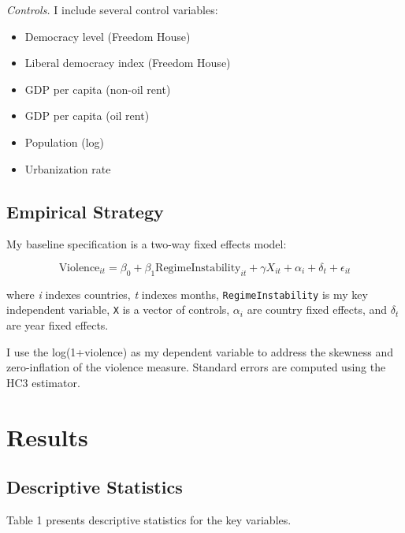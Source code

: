 \documentclass[12pt]{article}
\begin{document}
\textit{Controls.} I include several control variables:
\begin{itemize}
    \item Democracy level (Freedom House)
    \item Liberal democracy index (Freedom House)
    \item GDP per capita (non-oil rent)
    \item GDP per capita (oil rent)
    \item Population (log)
    \item Urbanization rate
\end{itemize}

\subsection{Empirical Strategy}

My baseline specification is a two-way fixed effects model:

\begin{equation}
\text{Violence}_{it} = \beta_0 + \beta_1 \text{RegimeInstability}_{it} + \gamma X_{it} + \alpha_i + \delta_t + \epsilon_{it}
\end{equation}

where \textit{i} indexes countries, \textit{t} indexes months, \texttt{RegimeInstability} is my key independent variable, \texttt{X} is a vector of controls, \texttt{$\alpha_i$} are country fixed effects, and \texttt{$\delta_t$} are year fixed effects.

I use the log(1+violence) as my dependent variable to address the skewness and zero-inflation of the violence measure. Standard errors are computed using the HC3 estimator.

\section{Results}

\subsection{Descriptive Statistics}

Table 1 presents descriptive statistics for the key variables.
\end{document}
